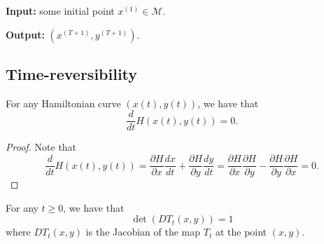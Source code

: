 \begin{algorithm2e}

\caption{Hamiltonian Monte Carlo}

\SetAlgoLined

\textbf{Input:} some initial point $x^{(1)}\in\mathcal{M}$.


\textbf{Output:} $(x^{(T+1)},y^{(T+1)})$.

\end{algorithm2e}

\subsection*{Time-reversibility }
\begin{lem}
\label{lem:ham_eng_pre}For any Hamiltonian curve $(x(t),y(t))$,
we have that
\[
\frac{d}{dt}H(x(t),y(t))=0.
\]
\end{lem}

\begin{proof}
Note that
\[
\frac{d}{dt}H(x(t),y(t))=\frac{\partial H}{\partial x}\frac{dx}{dt}+\frac{\partial H}{\partial y}\frac{dy}{dt}=\frac{\partial H}{\partial x}\frac{\partial H}{\partial y}-\frac{\partial H}{\partial y}\frac{\partial H}{\partial x}=0.
\]
\end{proof}
\begin{lem}
\label{lem:ham_measure_pre}For any $t\geq0$, we have that
\[
\det\left(DT_{t}(x,y)\right)=1
\]
where $DT_{t}(x,y)$ is the Jacobian of the map $T_{t}$ at the point
$(x,y)$.
\end{lem}

